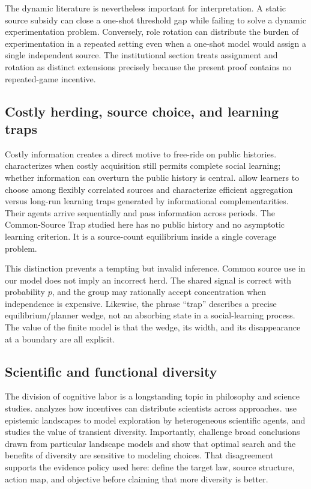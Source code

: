 \documentclass[11pt]{article}
\begin{document}
The dynamic literature is nevertheless important for interpretation. A static
source subsidy can close a one-shot threshold gap while failing to solve a
dynamic experimentation problem. Conversely, role rotation can distribute the
burden of experimentation in a repeated setting even when a one-shot model
would assign a single independent source. The institutional section treats
assignment and rotation as distinct extensions precisely because the present
proof contains no repeated-game incentive.

\subsection{Costly herding, source choice, and learning traps}

Costly information creates a direct motive to free-ride on public histories.
\citet{Ali2018} characterizes when costly acquisition still permits complete
social learning; whether information can overturn the public history is central.
\citet{LiangMu2020} allow learners to choose among flexibly correlated sources
and characterize efficient aggregation versus long-run learning traps generated
by informational complementarities. Their agents arrive sequentially and pass
information across periods. The Common-Source Trap studied here has no public
history and no asymptotic learning criterion. It is a source-count equilibrium
inside a single coverage problem.

This distinction prevents a tempting but invalid inference. Common source use
in our model does not imply an incorrect herd. The shared signal is correct with
probability $p$, and the group may rationally accept concentration when
independence is expensive. Likewise, the phrase ``trap'' describes a precise
equilibrium/planner wedge, not an absorbing state in a social-learning process.
The value of the finite model is that the wedge, its width, and its disappearance
at a boundary are all explicit.

\subsection{Scientific and functional diversity}

The division of cognitive labor is a longstanding topic in philosophy and
science studies. \citet{Kitcher1990} analyzes how incentives can distribute
scientists across approaches. \citet{WeisbergMuldoon2009} use epistemic
landscapes to model exploration by heterogeneous scientific agents, and
\citet{Zollman2010} studies the value of transient diversity. Importantly,
\citet{AlexanderEtAl2015} challenge broad conclusions drawn from particular
landscape models and show that optimal search and the benefits of diversity are
sensitive to modeling choices. That disagreement supports the evidence policy
used here: define the target law, source structure, action map, and objective
before claiming that more diversity is better.
\end{document}
